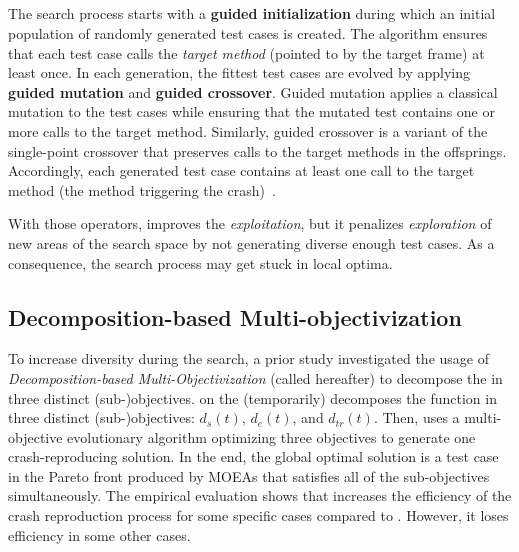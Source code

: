 \subsection{\SGGA}

The search process starts with a \textbf{guided initialization} during which an initial population of randomly generated test cases is created. The algorithm ensures that each test case calls the \textit{target method} (pointed to by the target frame) at least once. 
In each generation, the fittest test cases are evolved by applying \textbf{guided mutation} and \textbf{guided crossover}. Guided mutation applies a classical mutation to the test cases while ensuring that the mutated test contains one or more calls to the target method. 
Similarly, guided crossover is a variant of the single-point crossover that preserves calls to the target methods in the offsprings. Accordingly, each generated test case contains at least one call to the target method (\ie the method triggering the crash)~\cite{Soltani2018a}.

With those operators, \SGGA improves the \emph{exploitation}, but it penalizes \emph{exploration} of new areas of the search space by not generating diverse enough test cases. As a consequence, the search process may get stuck in local optima. 


\subsection{Decomposition-based Multi-objectivization}

To increase diversity during the search, a prior study \cite{Soltani2018b} investigated the usage of \emph{Decomposition-based Multi-Objectivization} (called \decomposition hereafter) to decompose the \CrashFunction in three distinct (sub-)objectives. 
\decomposition on the \CrashFunction (temporarily) decomposes the function in three distinct (sub-)objectives: $d_{s}(t)$, $d_{e}(t)$, and $d_{tr}(t)$. Then, \decomposition uses a multi-objective evolutionary algorithm optimizing three objectives to generate one crash-reproducing solution. 
In the end, the global optimal solution is a test case in the Pareto front produced by MOEAs that satisfies all of the sub-objectives simultaneously.
%
The empirical evaluation shows that \decomposition increases the efficiency of the crash reproduction process for some specific cases compared to \SGGA. However, it loses efficiency in some other cases.

